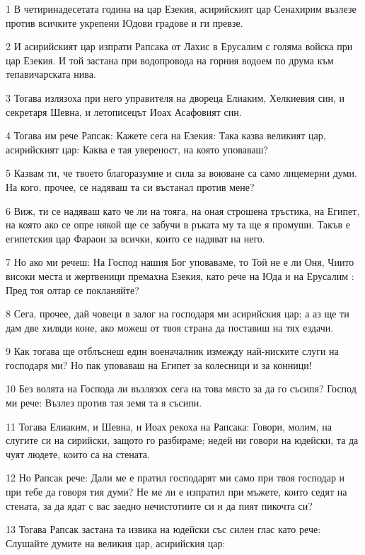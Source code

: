 \par 1 В четиринадесетата година на цар Езекия, асирийският цар Сенахирим възлезе против всичките укрепени Юдови градове и ги превзе.
\par 2 И асирийският цар изпрати Рапсака от Лахис в Ерусалим с голяма войска при цар Езекия. И той застана при водопровода на горния водоем по друма към тепавичарската нива.
\par 3 Тогава излязоха при него управителя на двореца Елиаким, Хелкиевия син, и секретаря Шевна, и летописецът Иоах Асафовият син.
\par 4 Тогава им рече Рапсак: Кажете сега на Езекия: Така казва великият цар, асирийският цар: Каква е тая увереност, на която уповаваш?
\par 5 Казвам ти, че твоето благоразумие и сила за воюване са само лицемерни думи. На кого, прочее, се надяваш та си въстанал против мене?
\par 6 Виж, ти се надяваш като че ли на тояга, на оная строшена тръстика, на Египет, на която ако се опре някой ще се забучи в ръката му та ще я промуши. Такъв е египетския цар Фараон за всички, които се надяват на него.
\par 7 Но ако ми речеш: На Господ нашия Бог уповаваме, то Той не е ли Оня, Чиито високи места и жертвеници премахна Езекия, като рече на Юда и на Ерусалим : Пред тоя олтар се покланяйте?
\par 8 Сега, прочее, дай човеци в залог на господаря ми асирийския цар; а аз ще ти дам две хиляди коне, ако можеш от твоя страна да поставиш на тях ездачи.
\par 9 Как тогава ще отблъснеш един военачалник измежду най-ниските слуги на господаря ми? Но пак уповаваш на Египет за колесници и за конници!
\par 10 Без волята на Господа ли възлязох сега на това място за да го съсипя? Господ ми рече: Възлез против тая земя та я съсипи.
\par 11 Тогава Елиаким, и Шевна, и Иоах рекоха на Рапсака: Говори, молим, на слугите си на сирийски, защото го разбираме; недей ни говори на юдейски, та да чуят людете, които са на стената.
\par 12 Но Рапсак рече: Дали ме е пратил господарят ми само при твоя господар и при тебе да говоря тия думи? Не ме ли е изпратил при мъжете, които седят на стената, за да ядат с вас заедно нечистотиите си и да пият пикочта си?
\par 13 Тогава Рапсак застана та извика на юдейски със силен глас като рече: Слушайте думите на великия цар, асирийския цар:
